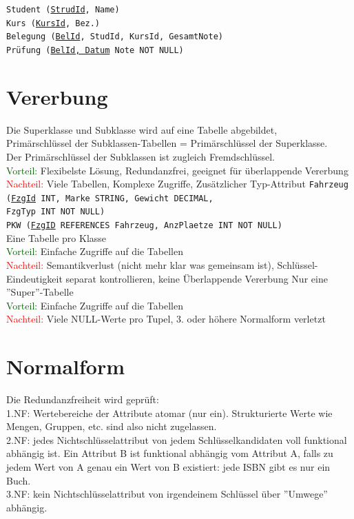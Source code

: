 \documentclass[10pt,landscape,a4paper]{scrartcl}
\newcommand{\drule}[3][0]{%
	\tikz[baseline]{\path[decoration={markings,
			mark=between positions 0 and 1 step 2*#3
			with {\node[fill, circle, minimum width=#3, inner sep=0pt, anchor=south west] {};}},postaction={decorate}]  (0,#1) -- ++(#2,0);}}
\begin{document}
\begin{multicols*}{5}
\begin{center}
	\end{center}
	\texttt{Student (\underline{StrudId}, Name)\\
		Kurs (\underline{KursId}, Bez.)\\
		Belegung (\underline{BelId}, StudId, KursId, GesamtNote)\\
		Prüfung (\underline{BelId, Datum} Note NOT NULL)}

\section{Vererbung}
Die \textcolor{b}{Superklasse} und \textcolor{b}{Subklasse} wird auf eine Tabelle abgebildet,\\
Primärschlüssel der Subklassen-Tabellen \textcolor{b}{=} Primärschlüssel der Superklasse.\\
Der \textcolor{b}{Primärschlüssel} der Subklassen ist zugleich Fremdschlüssel.\\
\textcolor{darkgreen}{Vorteil:} Flexibelste Lösung, Redundanzfrei, geeignet für überlappende Vererbung\\
\textcolor{red}{Nachteil:} Viele Tabellen, Komplexe Zugriffe, Zusätzlicher Typ-Attribut
\texttt{Fahrzeug (\underline{FzgId} INT, Marke STRING, Gewicht DECIMAL,\\
	FzgTyp INT NOT NULL)\\
	PKW (\underline{FzgID} REFERENCES Fahrzeug, AnzPlaetze INT NOT NULL)}\\
\drule{5.5cm}{1pt}
\textcolor{b}{Eine Tabelle pro Klasse}\\
\textcolor{darkgreen}{Vorteil:} Einfache Zugriffe auf die Tabellen\\
\textcolor{red}{Nachteil:} Semantikverlust (nicht mehr klar was gemeinsam ist), Schlüssel-Eindeutigkeit separat kontrollieren, keine Überlappende Vererbung
\drule{5.5cm}{1pt}
Nur eine ''Super''-Tabelle\\
\textcolor{darkgreen}{Vorteil:} Einfache Zugriffe auf die Tabellen\\
\textcolor{red}{Nachteil:} Viele NULL-Werte pro Tupel, 3. oder höhere Normalform verletzt

\section{Normalform}
Die Redundanzfreiheit wird geprüft:\\
\textcolor{b}{1.NF:} Wertebereiche der Attribute \textcolor{b}{atomar} (nur ein). Strukturierte Werte wie Mengen, Gruppen, etc. sind also nicht zugelassen.\\
\textcolor{b}{2.NF:} jedes \textcolor{b}{Nichtschlüsselattribut} von \textcolor{b}{jedem Schlüsselkandidaten} voll \textcolor{b}{funktional abhängig} ist. Ein Attribut B ist funktional abhängig vom Attribut A, falls zu jedem Wert von A genau ein Wert von B existiert: jede ISBN gibt es nur ein Buch.\\
\textcolor{b}{3.NF:} kein Nichtschlüsselattribut von irgendeinem Schlüssel über ''Umwege'' abhängig.\\



\end{multicols*}
\end{document}
